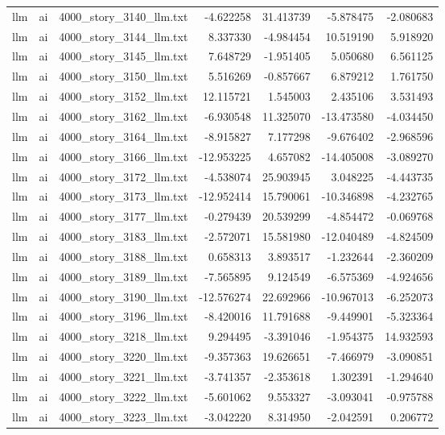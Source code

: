 \begin{longtable}{lllrrrr}
llm & ai & 4000\_story\_3140\_llm.txt & -4.622258 & 31.413739 & -5.878475 & -2.080683 \\
llm & ai & 4000\_story\_3144\_llm.txt & 8.337330 & -4.984454 & 10.519190 & 5.918920 \\
llm & ai & 4000\_story\_3145\_llm.txt & 7.648729 & -1.951405 & 5.050680 & 6.561125 \\
llm & ai & 4000\_story\_3150\_llm.txt & 5.516269 & -0.857667 & 6.879212 & 1.761750 \\
llm & ai & 4000\_story\_3152\_llm.txt & 12.115721 & 1.545003 & 2.435106 & 3.531493 \\
llm & ai & 4000\_story\_3162\_llm.txt & -6.930548 & 11.325070 & -13.473580 & -4.034450 \\
llm & ai & 4000\_story\_3164\_llm.txt & -8.915827 & 7.177298 & -9.676402 & -2.968596 \\
llm & ai & 4000\_story\_3166\_llm.txt & -12.953225 & 4.657082 & -14.405008 & -3.089270 \\
llm & ai & 4000\_story\_3172\_llm.txt & -4.538074 & 25.903945 & 3.048225 & -4.443735 \\
llm & ai & 4000\_story\_3173\_llm.txt & -12.952414 & 15.790061 & -10.346898 & -4.232765 \\
llm & ai & 4000\_story\_3177\_llm.txt & -0.279439 & 20.539299 & -4.854472 & -0.069768 \\
llm & ai & 4000\_story\_3183\_llm.txt & -2.572071 & 15.581980 & -12.040489 & -4.824509 \\
llm & ai & 4000\_story\_3188\_llm.txt & 0.658313 & 3.893517 & -1.232644 & -2.360209 \\
llm & ai & 4000\_story\_3189\_llm.txt & -7.565895 & 9.124549 & -6.575369 & -4.924656 \\
llm & ai & 4000\_story\_3190\_llm.txt & -12.576274 & 22.692966 & -10.967013 & -6.252073 \\
llm & ai & 4000\_story\_3196\_llm.txt & -8.420016 & 11.791688 & -9.449901 & -5.323364 \\
llm & ai & 4000\_story\_3218\_llm.txt & 9.294495 & -3.391046 & -1.954375 & 14.932593 \\
llm & ai & 4000\_story\_3220\_llm.txt & -9.357363 & 19.626651 & -7.466979 & -3.090851 \\
llm & ai & 4000\_story\_3221\_llm.txt & -3.741357 & -2.353618 & 1.302391 & -1.294640 \\
llm & ai & 4000\_story\_3222\_llm.txt & -5.601062 & 9.553327 & -3.093041 & -0.975788 \\
llm & ai & 4000\_story\_3223\_llm.txt & -3.042220 & 8.314950 & -2.042591 & 0.206772 \\

\end{longtable}
